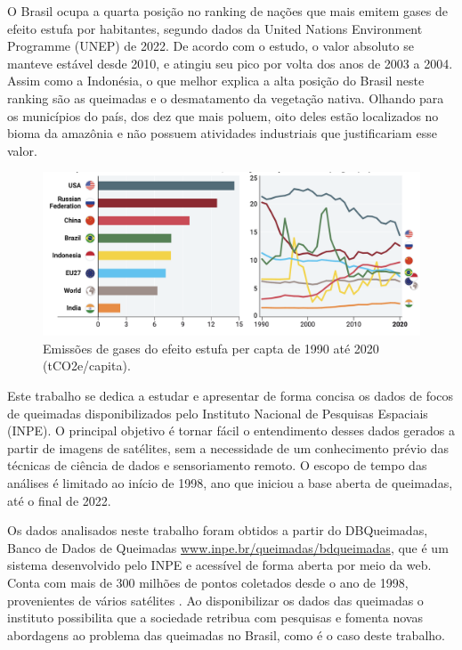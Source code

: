 \documentclass[cic,tc]{iiufrgs}
\begin{document}
O Brasil ocupa a quarta posição no ranking de nações que mais emitem gases de efeito estufa por habitantes, segundo dados da United Nations Environment Programme (UNEP) de 2022. De acordo com o estudo, o valor absoluto se manteve estável desde 2010, e atingiu seu pico por volta dos anos de 2003 a 2004. Assim como a Indonésia, o que melhor explica a alta posição do Brasil neste ranking são as queimadas e o desmatamento da vegetação nativa. Olhando para os municípios do país, dos dez que mais poluem, oito deles estão localizados no bioma da amazônia e não possuem atividades industriais que justificariam esse valor.

\begin{figure}[!htb]
    \caption{Emissões de gases do efeito estufa per capta de 1990 até 2020 (tCO2e/capita).}
    \begin{center}
        \includegraphics[width=35em]{emissoes_gee_per_capta}
    \end{center}
    \label{fig:emissoes_gee_per_capta}
\end{figure}

Este trabalho se dedica a estudar e apresentar de forma concisa os dados de focos de queimadas disponibilizados pelo Instituto Nacional de Pesquisas Espaciais (INPE). O principal objetivo é tornar fácil o entendimento desses dados gerados a partir de imagens de satélites, sem a necessidade de um conhecimento prévio das técnicas de ciência de dados e sensoriamento remoto. O escopo de tempo das análises é limitado ao início de 1998, ano que iniciou a base aberta de queimadas, até o final de 2022. 

Os dados analisados neste trabalho foram obtidos a partir do DBQueimadas, Banco de Dados de Queimadas \url{www.inpe.br/queimadas/bdqueimadas}, que é um sistema desenvolvido pelo INPE e acessível de forma aberta por meio da web. Conta com mais de 300 milhões de pontos coletados desde o ano de 1998, provenientes de vários satélites \citep{setzer2019banco}. Ao disponibilizar os dados das queimadas o instituto possibilita que a sociedade retribua com pesquisas e fomenta novas abordagens ao problema das queimadas no Brasil, como é o caso deste trabalho.
\end{document}
